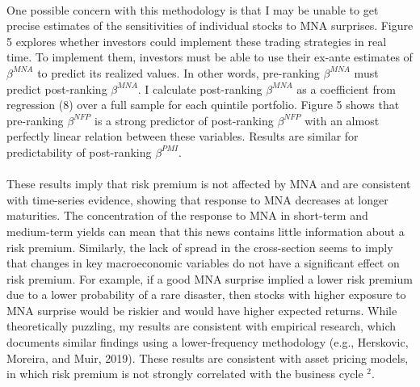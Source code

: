 \documentclass[12pt]{article}
\begin{document}
\paragraph{}
One possible concern with this methodology is that I may be unable to get precise estimates of the sensitivities of individual stocks to MNA surprises. Figure 5 explores whether investors could implement these trading strategies in real time. To implement them, investors must be able to use their ex-ante estimates of $\beta^{MNA}$ to predict its realized values. In other words, pre-ranking $\beta^{MNA}$ must predict post-ranking $\beta^{MNA}$. I calculate post-ranking $\beta^{MNA}$ as a coefficient from regression (8) over a full sample for each quintile portfolio. Figure 5 shows that pre-ranking $\beta^{NFP}$ is a strong predictor of post-ranking $\beta^{NFP}$ with an almost perfectly linear relation between these variables. Results are similar for predictability of post-ranking $\beta^{PMI}$.
\paragraph{}
These results imply that risk premium is not affected by MNA and are consistent with time-series evidence, showing that response to MNA decreases at longer maturities. The concentration of the response to MNA in short-term and medium-term yields can mean that this news contains little information about a risk premium. Similarly, the lack of spread in the cross-section seems to imply that changes in key macroeconomic variables do not have a significant effect on risk premium.
For example, if a good MNA surprise implied a lower risk premium due to a lower probability of a rare disaster, then stocks with higher exposure to MNA surprise would be riskier and would have higher expected returns. While theoretically puzzling, my results are consistent with empirical research, which documents similar findings using a lower-frequency methodology (e.g., Herskovic, Moreira, and Muir, 2019). These results are consistent with asset pricing models, in which risk premium is not strongly correlated with the business cycle $^2$. 
\end{document}
